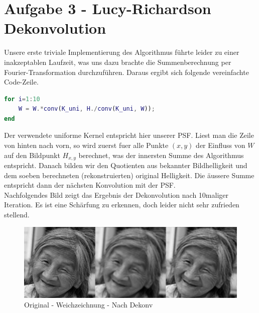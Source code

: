 \section*{Aufgabe 3 - Lucy-Richardson Dekonvolution}
Unsere erste triviale Implementierung des Algorithmus f\"uhrte leider zu einer inakzeptablen Laufzeit, 
was uns dazu brachte die Summenberechnung per Fourier-Transformation durchzuf\"uhren. Daraus ergibt 
sich folgende vereinfachte Code-Zeile.
\begin{lstlisting}[language=matlab]
for i=1:10
    W = W.*conv(K_uni, H./conv(K_uni, W));
end
\end{lstlisting}
Der verwendete uniforme Kernel entspricht hier unserer PSF. Liest man die Zeile von hinten nach vorn,
so wird zuerst fuer alle Punkte $(x,y)$ der Einfluss von $W$ auf den Bildpunkt $H_{x,y}$ berechnet, was
der innersten Summe des Algorithmus entspricht. Danach bilden wir den Quotienten aus bekannter Bildhelligkeit und
dem soeben berechneten (rekonstruierten) original Helligkeit. Die \"aussere Summe entspricht dann der n\"achsten
Konvolution mit der PSF.
\\
Nachfolgendes Bild zeigt das Ergebnis der Dekonvolution nach 10maliger Iteration. Es ist eine Sch\"arfung zu
erkennen, doch leider nicht sehr zufrieden stellend.

\begin{figure}[H]
\begin{center}
\includegraphics[width=150mm]{u05/task3.eps}
\end{center}
\caption{Original - Weichzeichnung - Nach Dekonv}
\end{figure}


